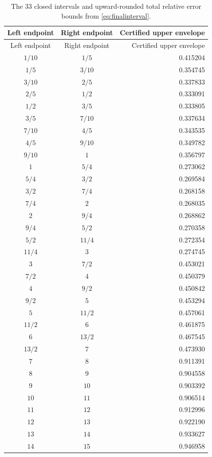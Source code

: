 \begin{longtable}{c c r}
\caption{The 33 closed intervals and upward-rounded total relative error bounds from \eqref{eq:finalinterval}.}\label{tab:intervals}\\
\toprule Left endpoint & Right endpoint & Certified upper envelope\\\midrule
\endfirsthead
\toprule Left endpoint & Right endpoint & Certified upper envelope\\\midrule
\endhead
\bottomrule\endfoot
$1/10$ & $1/5$ & 0.415204\\
$1/5$ & $3/10$ & 0.354745\\
$3/10$ & $2/5$ & 0.337833\\
$2/5$ & $1/2$ & 0.333091\\
$1/2$ & $3/5$ & 0.333805\\
$3/5$ & $7/10$ & 0.337634\\
$7/10$ & $4/5$ & 0.343535\\
$4/5$ & $9/10$ & 0.349782\\
$9/10$ & $1$ & 0.356797\\
$1$ & $5/4$ & 0.273062\\
$5/4$ & $3/2$ & 0.269584\\
$3/2$ & $7/4$ & 0.268158\\
$7/4$ & $2$ & 0.268035\\
$2$ & $9/4$ & 0.268862\\
$9/4$ & $5/2$ & 0.270358\\
$5/2$ & $11/4$ & 0.272354\\
$11/4$ & $3$ & 0.274745\\
$3$ & $7/2$ & 0.453021\\
$7/2$ & $4$ & 0.450379\\
$4$ & $9/2$ & 0.450842\\
$9/2$ & $5$ & 0.453294\\
$5$ & $11/2$ & 0.457061\\
$11/2$ & $6$ & 0.461875\\
$6$ & $13/2$ & 0.467545\\
$13/2$ & $7$ & 0.473930\\
$7$ & $8$ & 0.911391\\
$8$ & $9$ & 0.904558\\
$9$ & $10$ & 0.903392\\
$10$ & $11$ & 0.906514\\
$11$ & $12$ & 0.912996\\
$12$ & $13$ & 0.922190\\
$13$ & $14$ & 0.933627\\
$14$ & $15$ & 0.946958\\
\end{longtable}
